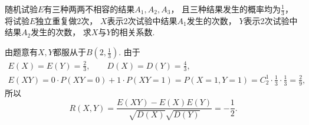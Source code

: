 \begin{example}
随机试验\(E\)有三种两两不相容的结果\(A_1,A_2,A_3\)，
且三种结果发生的概率均为\(\frac13\)，
将试验\(E\)独立重复做2次，
\(X\)表示2次试验中结果\(A_1\)发生的次数，
\(Y\)表示2次试验中结果\(A_2\)发生的次数，
求\(X\)与\(Y\)的相关系数.
\begin{solution}
由题意有\(X,Y\)都服从于\(B(2,\frac13)\).
由于\begin{gather*}
	E(X) = E(Y) = \frac23, \qquad
	D(X) = D(Y) = \frac43, \\
	E(XY) = 0 \cdot P(XY=0) + 1 \cdot P(XY=1)
	= P(X=1,Y=1)
	= C_2^1 \cdot \frac13 \cdot \frac13
	= \frac29,
\end{gather*}
所以\begin{equation*}
	R(X,Y)
	= \frac{E(XY) - E(X) E(Y)}{\sqrt{D(X)} \sqrt{D(Y)}}
	= -\frac12.
\end{equation*}
\end{solution}
\end{example}
